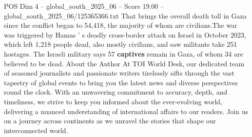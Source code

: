\begin{textsample}{POS Dim 4 – global\_south\_2025\_06 – Score 19.00 – global\_south\_2025\_06/125365366.txt}
That brings the overall death toll in Gaza since the conflict began to 54,418, the majority of whom are civilians.The war was triggered by Hamas ' s deadly cross-border attack on Israel in October 2023, which left 1,218 people dead, also mostly civilians, and saw militants take 251 hostages.
The Israeli military says 57 \textbf{captives} remain in Gaza, of whom 34 are believed to be dead.
About the Author At TOI World Desk, our dedicated team of seasoned journalists and passionate writers tirelessly sifts through the vast tapestry of global events to bring you the latest news and diverse perspectives round the clock.
With an unwavering commitment to accuracy, depth, and timeliness, we strive to keep you informed about the ever-evolving world, delivering a nuanced understanding of international affairs to our readers.
Join us on a journey across continents as we unravel the stories that shape our interconnected world.

\end{textsample}
